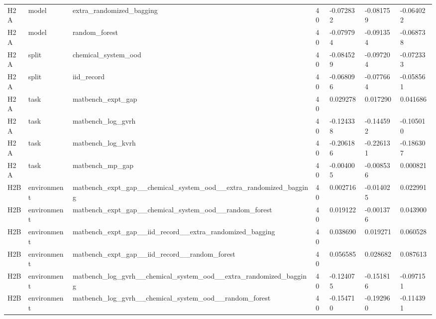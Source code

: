 \documentclass[10pt]{article}
\begin{document}
\begin{landscape}
\begin{longtable}{L{.35in}L{.6in}L{3.55in}L{.4in}L{.88in}L{.88in}L{.88in}}
H2A & model & extra\_\allowbreak{}randomized\_\allowbreak{}bagging & 40 & -0.072832 & -0.081759 & -0.064022\\
H2A & model & random\_\allowbreak{}forest & 40 & -0.079794 & -0.091354 & -0.068738\\
H2A & split & chemical\_\allowbreak{}system\_\allowbreak{}ood & 40 & -0.084529 & -0.097204 & -0.072333\\
H2A & split & iid\_\allowbreak{}record & 40 & -0.068096 & -0.077664 & -0.058561\\
H2A & task & matbench\_\allowbreak{}expt\_\allowbreak{}gap & 40 & 0.029278 & 0.017290 & 0.041686\\
H2A & task & matbench\_\allowbreak{}log\_\allowbreak{}gvrh & 40 & -0.124338 & -0.144592 & -0.105010\\
H2A & task & matbench\_\allowbreak{}log\_\allowbreak{}kvrh & 40 & -0.206186 & -0.226131 & -0.186307\\
H2A & task & matbench\_\allowbreak{}mp\_\allowbreak{}gap & 40 & -0.004005 & -0.008536 & 0.000821\\
H2B & environment & matbench\_\allowbreak{}expt\_\allowbreak{}gap\_\allowbreak{}\_\allowbreak{}chemical\_\allowbreak{}system\_\allowbreak{}ood\_\allowbreak{}\_\allowbreak{}extra\_\allowbreak{}randomized\_\allowbreak{}bagging & 40 & 0.002716 & -0.014025 & 0.022991\\
H2B & environment & matbench\_\allowbreak{}expt\_\allowbreak{}gap\_\allowbreak{}\_\allowbreak{}chemical\_\allowbreak{}system\_\allowbreak{}ood\_\allowbreak{}\_\allowbreak{}random\_\allowbreak{}forest & 40 & 0.019122 & -0.001376 & 0.043900\\
H2B & environment & matbench\_\allowbreak{}expt\_\allowbreak{}gap\_\allowbreak{}\_\allowbreak{}iid\_\allowbreak{}record\_\allowbreak{}\_\allowbreak{}extra\_\allowbreak{}randomized\_\allowbreak{}bagging & 40 & 0.038690 & 0.019271 & 0.060528\\
H2B & environment & matbench\_\allowbreak{}expt\_\allowbreak{}gap\_\allowbreak{}\_\allowbreak{}iid\_\allowbreak{}record\_\allowbreak{}\_\allowbreak{}random\_\allowbreak{}forest & 40 & 0.056585 & 0.028682 & 0.087613\\
H2B & environment & matbench\_\allowbreak{}log\_\allowbreak{}gvrh\_\allowbreak{}\_\allowbreak{}chemical\_\allowbreak{}system\_\allowbreak{}ood\_\allowbreak{}\_\allowbreak{}extra\_\allowbreak{}randomized\_\allowbreak{}bagging & 40 & -0.124075 & -0.151816 & -0.097151\\
H2B & environment & matbench\_\allowbreak{}log\_\allowbreak{}gvrh\_\allowbreak{}\_\allowbreak{}chemical\_\allowbreak{}system\_\allowbreak{}ood\_\allowbreak{}\_\allowbreak{}random\_\allowbreak{}forest & 40 & -0.154710 & -0.192960 & -0.114391\\

\end{longtable}
\end{landscape}
\end{document}
